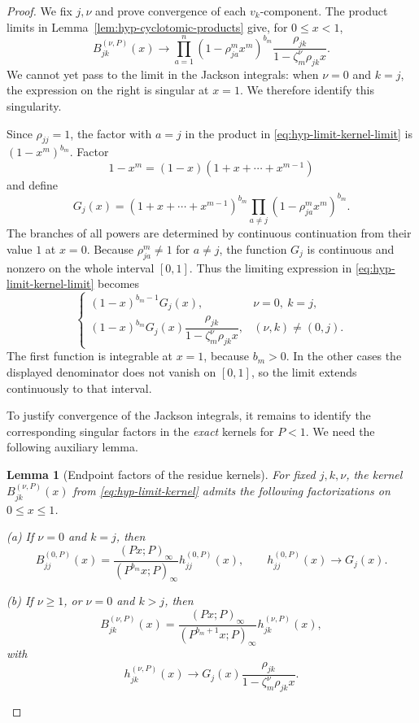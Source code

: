 \documentclass[12pt]{amsart}
\newtheorem{lem}[thm]{Lemma}
\theoremstyle{definition}
\numberwithin{equation}{section}
\theoremstyle{definition}
\let\ge\geqslant
\let\le\leqslant
\def\beq{\begin{equation}}
\def\eeq{\end{equation}}
\begin{document}
\begin{proof}
We fix $j,\nu$ and prove convergence of each $v_k$-component.
The product limits in Lemma~\ref{lem:hyp-cyclotomic-products}
give, for $0\le x<1$,
\beq\label{eq:hyp-limit-kernel-limit}
 B_{jk}^{(\nu,P)}(x)\longrightarrow
 \prod_{a=1}^n(1-\rho_{ja}^m x^m)^{b_m}
 \frac{\rho_{jk}}{1-\zeta_m^\nu\rho_{jk}x}.
\eeq
We cannot yet pass to the limit in the Jackson integrals:
when $\nu=0$ and $k=j$, the expression on the right is
singular at $x=1$. We therefore identify this singularity.

Since $\rho_{jj}=1$, the factor with $a=j$ in the
product in \eqref{eq:hyp-limit-kernel-limit} is
$(1-x^m)^{b_m}$. Factor
\[
 1-x^m=(1-x)(1+x+\cdots+x^{m-1})
\]
and define
\beq\label{eq:hyp-limit-Gj}
 G_j(x)=
 (1+x+\cdots+x^{m-1})^{b_m}
 \prod_{a\ne j}(1-\rho_{ja}^m x^m)^{b_m}.
\eeq
The branches of all powers are determined by continuous
continuation from their value $1$ at $x=0$. Because
$\rho_{ja}^m\ne1$ for $a\ne j$, the function $G_j$ is
continuous and nonzero on the whole interval $[0,1]$.
Thus the limiting expression in
\eqref{eq:hyp-limit-kernel-limit} becomes
\[
 \begin{cases}
 (1-x)^{b_m-1}G_j(x),&\nu=0,\ k=j,\\[3pt]
 (1-x)^{b_m}G_j(x)
       \dfrac{\rho_{jk}}{1-\zeta_m^\nu\rho_{jk}x},
       &(\nu,k)\ne(0,j).
 \end{cases}
\]
The first function is integrable at $x=1$, because
$b_m>0$. In the other cases the displayed denominator
does not vanish on $[0,1]$, so the limit extends
continuously to that interval.

To justify convergence of the Jackson integrals, it
remains to identify the corresponding singular factors
in the \emph{exact} kernels for $P<1$. We need the
following auxiliary lemma.

\begin{lem}[Endpoint factors of the residue kernels]
\label{lem:hyp-endpoint}
For fixed $j,k,\nu$, the kernel $B_{jk}^{(\nu,P)}(x)$ from
\eqref{eq:hyp-limit-kernel} admits the following
factorizations on $0\le x\le1$.

\emph{(a)} If $\nu=0$ and $k=j$, then
\beq\label{eq:hyp-endpoint-diagonal}
 B_{jj}^{(0,P)}(x)=
 \frac{(Px;P)_\infty}{(P^{b_m}x;P)_\infty}
 h_{jj}^{(0,P)}(x),
 \qquad h_{jj}^{(0,P)}(x)\longrightarrow G_j(x).
\eeq

\emph{(b)} If $\nu\ge1$, or $\nu=0$ and $k>j$, then
\beq\label{eq:hyp-endpoint-regular}
 B_{jk}^{(\nu,P)}(x)=
 \frac{(Px;P)_\infty}{(P^{b_m+1}x;P)_\infty}
 h_{jk}^{(\nu,P)}(x),
\eeq
with
\beq\label{eq:hyp-endpoint-h-limit}
 h_{jk}^{(\nu,P)}(x)\longrightarrow
 G_j(x)\frac{\rho_{jk}}{1-\zeta_m^\nu\rho_{jk}x}.
\eeq


\end{lem}
\end{proof}
\end{document}
